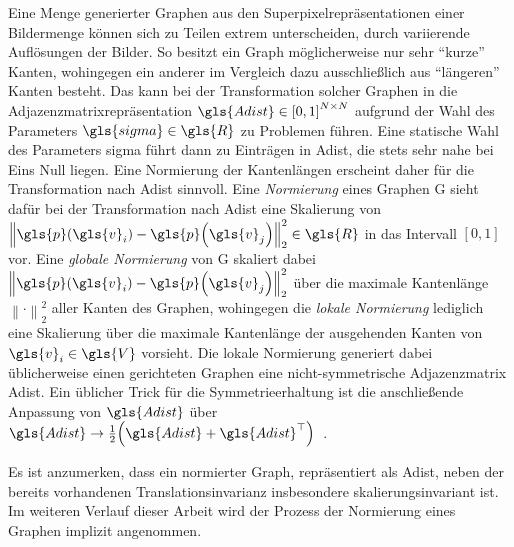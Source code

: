 Eine Menge generierter Graphen aus den Superpixelrepräsentationen einer Bildermenge können sich zu Teilen extrem unterscheiden, \bspw{} durch variierende Auflösungen der Bilder.
So besitzt ein Graph möglicherweise nur sehr \enquote{kurze} Kanten, wohingegen ein anderer im Vergleich dazu ausschließlich aus \enquote{längeren} Kanten besteht.
Das kann bei der Transformation solcher Graphen in die Adjazenzmatrixrepräsentation $\gls{Adist} \in {\left[0, 1\right]}^{N \times N}$ aufgrund der Wahl des Parameters $\gls{sigma} \in \gls{R}$ zu Problemen führen.
Eine statische Wahl des Parameters \gls{sigma} führt dann \ggf{} zu Einträgen in \gls{Adist}, die stets sehr nahe bei Eins \bzw{} Null liegen.
Eine Normierung der Kantenlängen erscheint daher für die Transformation nach \gls{Adist} sinnvoll.
Eine \emph{Normierung} eines Graphen \gls{G} sieht dafür bei der Transformation nach \gls{Adist} eine Skalierung von ${\left\|\gls{p}\left(\gls{v}_i\right) - \gls{p}\left(\gls{v}_j\right)\right\|}_2^2 \in \gls{R}$ in das Intervall $\left[0, 1\right]$ vor.
Eine \emph{globale Normierung} von \gls{G} skaliert dabei ${\left\|\gls{p}\left(\gls{v}_i\right) - \gls{p}\left(\gls{v}_j\right)\right\|}_2^2$ über die maximale Kantenlänge ${\left\|\cdot\right\|}_2^2$ aller Kanten des Graphen, wohingegen die \emph{lokale Normierung} lediglich eine Skalierung über die maximale Kantenlänge der ausgehenden Kanten von $\gls{v}_i \in \gls{V}$ vorsieht.
Die lokale Normierung generiert dabei üblicherweise einen gerichteten Graphen \bzw{} eine nicht-symmetrische Adjazenzmatrix \gls{Adist}.
Ein üblicher Trick für die Symmetrieerhaltung ist die anschließende Anpassung von $\gls{Adist}$ über $\gls{Adist} \rightarrow \frac{1}{2}\left(\gls{Adist} + \gls{Adist}^{\top}\right)$~\cite{Reuter}.

Es ist anzumerken, dass ein normierter Graph, repräsentiert als \gls{Adist}, neben der bereits vorhandenen Translationsinvarianz insbesondere skalierungsinvariant ist.
Im weiteren Verlauf dieser Arbeit wird der Prozess der Normierung eines Graphen implizit angenommen.
